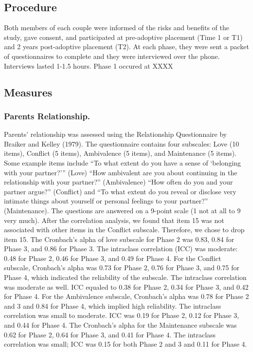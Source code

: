 \documentclass[man]{apa6}
\begin{document}
\hypertarget{procedure}{%
\subsection{Procedure}\label{procedure}}

Both members of each couple were informed of the risks and benefits of the study, gave consent, and participated at pre-adoptive placement (Time 1 or T1) and 2 years post-adoptive placement (T2). At each phase, they were sent a packet of questionnaires to complete and they were interviewed over the phone. Interviews lasted 1-1.5 hours. Phase 1 occured at XXXX

\hypertarget{measures}{%
\subsection{Measures}\label{measures}}

\hypertarget{parents-relationship.}{%
\subsubsection{Parents Relationship.}\label{parents-relationship.}}

Parents' relationship was assessed using the Relationship Questionnaire by Braiker and Kelley (1979). The questionnaire contains four subscales: Love (10 items), Conflict (5 items), Ambivalence (5 items), and Maintenance (5 items). Some example items include \enquote{To what extent do you have a sense of \enquote{belonging with your partner?}} (Love) \enquote{How ambivalent are you about continuing in the relationship with your partner?} (Ambivalence) \enquote{How often do you and your partner argue?} (Conflict) and \enquote{To what extent do you reveal or disclose very intimate things about yourself or personal feelings to your partner?} (Maintenance). The questions are answered on a 9-point scale (1 not at all to 9 very much). After the correlation analysis, we found that item 15 was not associated with other items in the Conflict subscale. Therefore, we chose to drop item 15. The Cronbach's alpha of love subscale for Phase 2 was 0.83, 0.84 for Phase 3, and 0.86 for Phase 3. The intraclass correlation (ICC) was moderate: 0.48 for Phase 2, 0.46 for Phase 3, and 0.49 for Phase 4. For the Conflict subscale, Cronbach's alpha was 0.73 for Phase 2, 0.76 for Phase 3, and 0.75 for Phase 4, which indicated the reliability of the subscale. The intraclass correlation was moderate as well. ICC equaled to 0.38 for Phase 2, 0.34 for Phase 3, and 0.42 for Phase 4. For the Ambivalence subscale, Cronbach's alpha was 0.78 for Phase 2 and 3 and 0.84 for Phase 4, which implied high reliability. The intraclass correlation was small to moderate. ICC was 0.19 for Phase 2, 0.12 for Phase 3, and 0.44 for Phase 4. The Cronbach's alpha for the Maintenance subscale was 0.62 for Phase 2, 0.64 for Phase 3, and 0.41 for Phase 4. The intraclass correlation was small; ICC was 0.15 for both Phase 2 and 3 and 0.11 for Phase 4.
\end{document}
